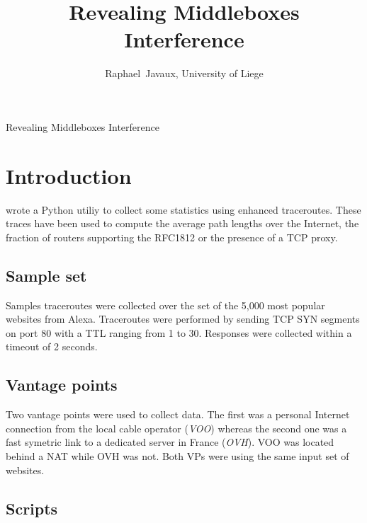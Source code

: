 \documentclass[journal]{IEEEtran}
\begin{document}
\title{Revealing Middleboxes Interference}

\author{Raphael~Javaux, University of Liege}

         {Revealing Middleboxes Interference}

\maketitle


\section{Introduction}

 wrote a Python utiliy to collect some statistics using enhanced traceroutes. These traces have been used to compute the average path lengths over the Internet, the fraction of routers supporting the RFC1812 or the presence of a TCP proxy.

\subsection{Sample set}

Samples traceroutes were collected over the set of the 5,000 most popular websites from Alexa. Traceroutes were performed by sending TCP SYN segments on port 80 with a TTL ranging from 1 to 30. Responses were collected within a timeout of 2 seconds.

\subsection{Vantage points}

Two vantage points were used to collect data. The first was a personal Internet connection from the local cable operator (\textit{VOO}) whereas the second one was a fast symetric link to a dedicated server in France (\textit{OVH}). VOO was located behind a NAT while OVH was not. Both VPs were using the same input set of websites.

\subsection{Scripts}
\end{document}
